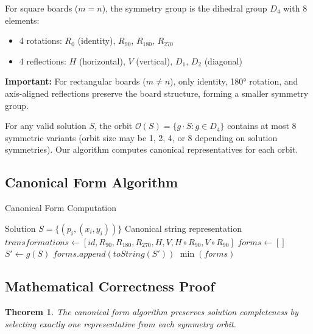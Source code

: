\documentclass[12pt,a4paper]{article}
\newtheorem{theorem}{Theorem}[section]
\theoremstyle{definition}
\begin{document}
For square boards ($m = n$), the symmetry group is the dihedral group $D_4$ with 8 elements:
\begin{itemize}
\item 4 rotations: $R_0$ (identity), $R_{90}$, $R_{180}$, $R_{270}$
\item 4 reflections: $H$ (horizontal), $V$ (vertical), $D_1$, $D_2$ (diagonal)
\end{itemize}

\textbf{Important:} For rectangular boards ($m \neq n$), only identity, 180° rotation, and axis-aligned reflections preserve the board structure, forming a smaller symmetry group.

For any valid solution $S$, the orbit $\mathcal{O}(S) = \{g \cdot S : g \in D_4\}$ contains at most 8 symmetric variants (orbit size may be 1, 2, 4, or 8 depending on solution symmetries). Our algorithm computes canonical representatives for each orbit.

\subsection{Canonical Form Algorithm}

\begin{algorithm}
\caption{Canonical Form Computation}
\begin{algorithmic}[1]
\REQUIRE Solution $S = \{(p_i, (x_i, y_i))\}$
\ENSURE Canonical string representation
\STATE $transformations \leftarrow [id, R_{90}, R_{180}, R_{270}, H, V, H \circ R_{90}, V \circ R_{90}]$
\STATE $forms \leftarrow []$
    \STATE $S' \leftarrow g(S)$
    \STATE $forms.append(toString(S'))$
\ENDFOR
\RETURN $\min(forms)$ 
\end{algorithmic}
\end{algorithm}

\subsection{Mathematical Correctness Proof}

\begin{theorem}
The canonical form algorithm preserves solution completeness by selecting exactly one representative from each symmetry orbit.
\end{theorem}
\end{document}
